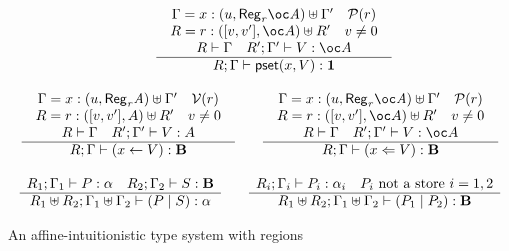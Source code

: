 \documentclass[11pt]{article}
\newcommand{\Gives}{\vdash}             \newcommand{\IGives}{\vdash_{I}}        \newcommand{\AIGives}{\vdash_{{\it AI}}} \newcommand{\CGives}{\vdash_{C}}
\newcommand{\hyp}[3]{#1:(#2, #3)}
\newcommand{\behtype}{{\bf B}}
\newcommand{\csum}{\uplus}              \newcommand{\dpar}{\mid\!\mid}
\newcommand{\infer}[2]{\begin{array}{c} #1 \\ \hline #2 \end{array}}
\newcommand{\pst}[2]{{\sf pset}(#1,#2)}
\newcommand{\rgtype}[2]{{\it {\sf Reg}_{#1} #2}}
\newcommand{\store}[2]{(#1 \leftarrow #2)}
\newcommand{\pstore}[2]{(#1 \Leftarrow #2)}
\newcommand{\upair}[2]{[#1,#2]}
\newcommand{\vlt}[1]{{\cal V}(#1)}
\newcommand{\prs}[1]{{\cal P}(#1)}
\begin{document}
\begin{table}
{\[\begin{array}{c}
\qquad

\infer{\begin{array}{c}
\Gamma= \hyp{x}{u}{\rgtype{r}{\bang A}} \csum \Gamma' \quad \prs{r}\\
R = \hyp{r}{\upair{v}{v'}}{\bang A} \csum R' \quad v \neq 0 \\
R\Gives \Gamma\quad R';\Gamma'\Gives V:\bang A
\end{array}}
{R;\Gamma \Gives \pst{x}{V}:\tertype} \\ \\ 


\infer{\begin{array}{c}
\Gamma= \hyp{x}{u}{\rgtype{r}{A}} \csum \Gamma' \quad \vlt{r}\\
R = \hyp{r}{\upair{v}{v'}}{A} \csum R' \quad v \neq 0 \\
R\Gives \Gamma \quad R';\Gamma'\Gives V:A
\end{array}}
{R;\Gamma \Gives \store{x}{V}:\behtype} 

\qquad

\infer{\begin{array}{c}
\Gamma= \hyp{x}{u}{\rgtype{r}{\bang A}} \csum \Gamma' \quad \prs{r}\\
R = \hyp{r}{\upair{v}{v'}}{\bang A} \csum R' \quad v \neq 0 \\
R\Gives \Gamma \quad R';\Gamma'\Gives V:\bang A
\end{array}}
{R;\Gamma \Gives \pstore{x}{V}:\behtype} \\ \\ 


\infer{R_1;\Gamma_1\Gives P:\alpha\quad R_2;\Gamma_2\Gives S:\behtype}
{R_1\csum R_2; \Gamma_1\csum \Gamma_2 \Gives (P \mid S):\alpha}

\qquad

\infer{R_i;\Gamma_i\Gives P_i:\alpha_i\quad P_i \mbox{ not a store } i=1,2}
{R_1\csum R_2; \Gamma_1\csum \Gamma_2 \Gives (P_1 \mid P_2):\behtype}

\end{array}
\]}
\caption{An affine-intuitionistic type system with regions}\label{air-system}
\end{table}
\end{document}
